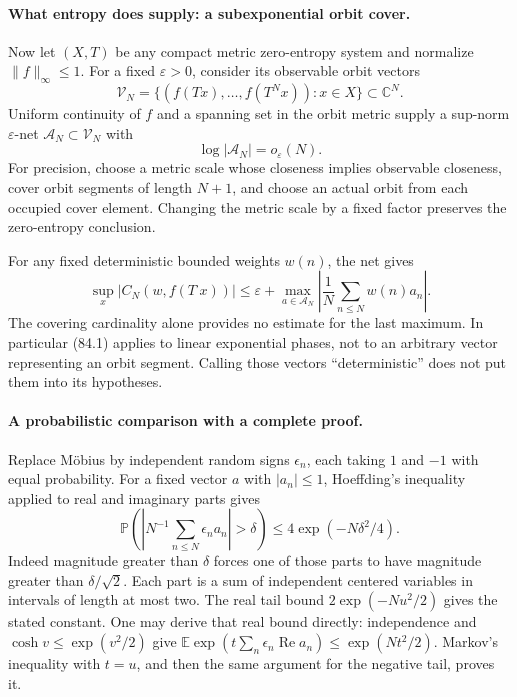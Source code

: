 \documentclass[11pt]{article}
\begin{document}
\paragraph{What entropy does supply: a subexponential orbit cover.}
Now let $(X,T)$ be any compact metric zero-entropy system and normalize
$\|f\|_\infty\leq1$. For a fixed $\varepsilon>0$, consider its observable
orbit vectors
\[
 \mathcal V_N=\{(f(Tx),\ldots,f(T^Nx)):x\in X\}
                  \subset\mathbb C^N.
\]
Uniform continuity of $f$ and a spanning set in the orbit metric supply
a sup-norm $\varepsilon$-net $\mathcal A_N\subset\mathcal V_N$ with
\[
                    \log|\mathcal A_N|=o_\varepsilon(N).\tag{84.4}
\]
For precision, choose a metric scale whose closeness implies observable
closeness, cover orbit segments of length $N+1$, and choose an actual
orbit from each occupied cover element. Changing the metric scale by a
fixed factor preserves the zero-entropy conclusion.

For any fixed deterministic bounded weights $w(n)$, the net gives
\[
 \sup_x|C_N(w,f(T^\cdot x))|
 \leq\varepsilon+
       \max_{a\in\mathcal A_N}\left|\frac1N\sum_{n\leq N}w(n)a_n\right|.
                                                               \tag{84.5}
\]
The covering cardinality alone provides no estimate for the last maximum.
In particular (84.1) applies to linear exponential phases, not to an
arbitrary vector representing an orbit segment. Calling those vectors
``deterministic'' does not put them into its hypotheses.

\paragraph{A probabilistic comparison with a complete proof.}
Replace Möbius by independent random signs $\epsilon_n$, each taking
$1$ and $-1$ with equal probability. For a fixed vector $a$ with
$|a_n|\leq1$, Hoeffding's inequality applied to real and imaginary parts
gives
\[
 \mathbb P\left(\left|N^{-1}\sum_{n\leq N}\epsilon_na_n\right|>\delta\right)
                  \leq4\exp(-N\delta^2/4).             \tag{84.6}
\]
Indeed magnitude greater than $\delta$ forces one of those parts to have
magnitude greater than $\delta/\sqrt2$. Each part is a sum of independent
centered variables in intervals of length at most two. The real tail bound
$2\exp(-N u^2/2)$ gives the stated constant.
One may derive that real bound directly: independence and
$\cosh v\leq\exp(v^2/2)$ give
$\mathbb E\exp(t\sum_n\epsilon_n\operatorname{Re}a_n)
\leq\exp(Nt^2/2)$. Markov's inequality with $t=u$, and then the same
argument for the negative tail, proves it.
\end{document}
